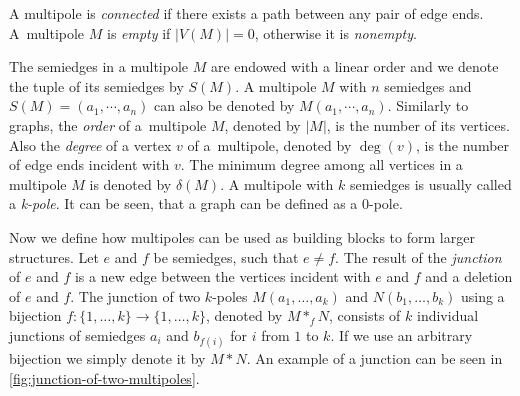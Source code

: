 \documentclass[12pt, twoside]{book}
\begin{document}
A multipole is \textit{connected} if there exists a path between any pair of edge ends. A~multipole $M$ is \textit{empty} if $|V(M)|=0$, otherwise it is \textit{nonempty}.

The semiedges in a multipole $M$ are endowed with a linear order and we denote the tuple of its semiedges by $S(M)$. A multipole $M$ with $n$ semiedges and ${S(M) = (a_1, \cdots, a_n)}$ can also be denoted by $M(a_1,\cdots,a_n)$. Similarly to graphs, the \textit{order} of a~multipole $M$, denoted by $|M|$, is the number of its vertices. Also the \textit{degree} of a vertex $v$ of a~multipole, denoted by $\deg(v)$, is the number of edge ends incident with $v$. The minimum degree among all vertices in a multipole $M$ is denoted by $\delta(M)$. A multipole with $k$ semiedges is usually called a \textit{k-pole}. It can be seen, that a graph can be defined as a 0-pole.

Now we define how multipoles can be used as building blocks to form larger structures. Let $e$ and $f$ be semiedges, such that $e\neq f$. The result of the \textit{junction} of $e$ and $f$ is a new edge between the vertices incident with $e$ and $f$ and a deletion of $e$ and $f$. The junction of two $k$-poles $M(a_1,\dots,a_k)$ and $N(b_1,\dots,b_k)$ using a bijection ${f:\{1,\dots,k\}\rightarrow\{1,\dots,k\}}$, denoted by $M*_fN$, consists of $k$ individual junctions of semiedges $a_i$ and $b_{f(i)}$ for $i$ from $1$ to $k$. If we use an arbitrary bijection we simply denote it by $M*N$. An example of a junction can be seen in \cref{fig:junction-of-two-multipoles}.
\end{document}

